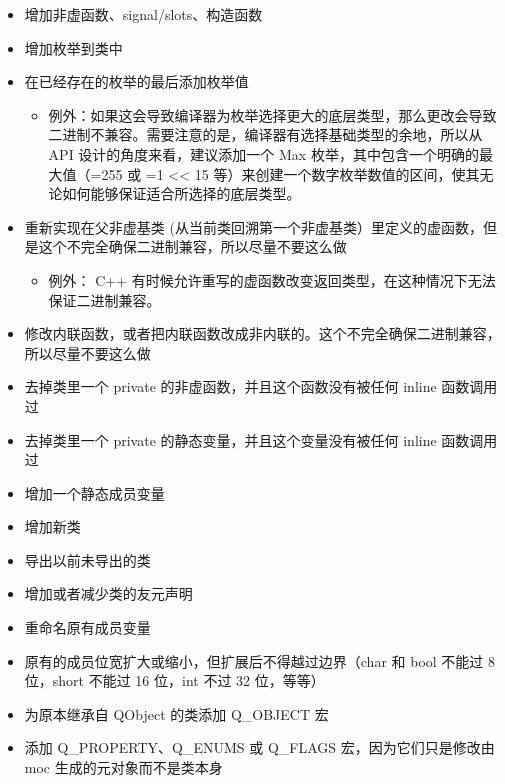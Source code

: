 \begin{itemize}

\item
  增加非虚函数、signal/slots、构造函数
\item
  增加枚举到类中
\item
  在已经存在的枚举的最后添加枚举值

  \begin{itemize}
  
  \item
    例外：如果这会导致编译器为枚举选择更大的底层类型，那么更改会导致二进制不兼容。需要注意的是，编译器有选择基础类型的余地，所以从
    API 设计的角度来看，建议添加一个 Max
    枚举，其中包含一个明确的最大值（=255 或 =1 \textless{}\textless{} 15
    等）来创建一个数字枚举数值的区间，使其无论如何能够保证适合所选择的底层类型。
  \end{itemize}
\item
  重新实现在父非虚基类
  (从当前类回溯第一个非虚基类）里定义的虚函数，但是这个不完全确保二进制兼容，所以尽量不要这么做

  \begin{itemize}
  
  \item
    例外： C++
    有时候允许重写的虚函数改变返回类型，在这种情况下无法保证二进制兼容。
  \end{itemize}
\item
  修改内联函数，或者把内联函数改成非内联的。这个不完全确保二进制兼容，所以尽量不要这么做
\item
  去掉类里一个 private 的非虚函数，并且这个函数没有被任何 inline
  函数调用过
\item
  去掉类里一个 private 的静态变量，并且这个变量没有被任何 inline
  函数调用过
\item
  增加一个静态成员变量
\item
  增加新类
\item
  导出以前未导出的类
\item
  增加或者减少类的友元声明
\item
  重命名原有成员变量
\item
  原有的成员位宽扩大或缩小，但扩展后不得越过边界（char 和 bool 不能过 8
  位，short 不能过 16 位，int 不过 32 位，等等）
\item
  为原本继承自 QObject 的类添加 Q\_OBJECT 宏
\item
  添加 Q\_PROPERTY、Q\_ENUMS 或 Q\_FLAGS 宏，因为它们只是修改由 moc
  生成的元对象而不是类本身
\end{itemize}

